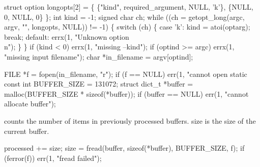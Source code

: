 \documentclass{article}%
\begin{document}
\nwendcode{}\endmoddef\nwstartdeflinemarkup{}\nwenddeflinemarkup
struct option longopts[2] = \{
        \{"kind", required_argument, NULL, 'k'\},
        \{NULL, 0, NULL, 0\}
\};
int kind = -1;
signed char ch;
while ((ch = getopt_long(argc, argv, "", longopts, NULL)) != -1) \{
        switch (ch) \{
        case 'k':
                kind = atoi(optarg);
                break;
        default:
                errx(1, "Unknown option\\n");
        \}
\}
if (kind < 0)
        errx(1, "missing --kind");
if (optind >= argc)
        errx(1, "missing input filename");
char *in_filename = argv[optind];


\nwendcode{}\endmoddef\nwstartdeflinemarkup{}\nwenddeflinemarkup
FILE *f = fopen(in_filename, "r");
if (f == NULL)
        err(1, "cannot open %
static const int BUFFER_SIZE = 131072;
struct dict_t *buffer = malloc(BUFFER_SIZE * sizeof(*buffer));
if (buffer == NULL)
        err(1, "cannot allocate buffer");


\nwendcode{} counts the number of items in previously processed buffers.
{\Tt{}size\nwendquote} is the size of the current buffer.

\nwenddocs{}\endmoddef\nwstartdeflinemarkup{}\nwenddeflinemarkup
processed += size;
size = fread(buffer, sizeof(*buffer), BUFFER_SIZE, f);
if (ferror(f))
        err(1, "fread failed");
\end{document}
